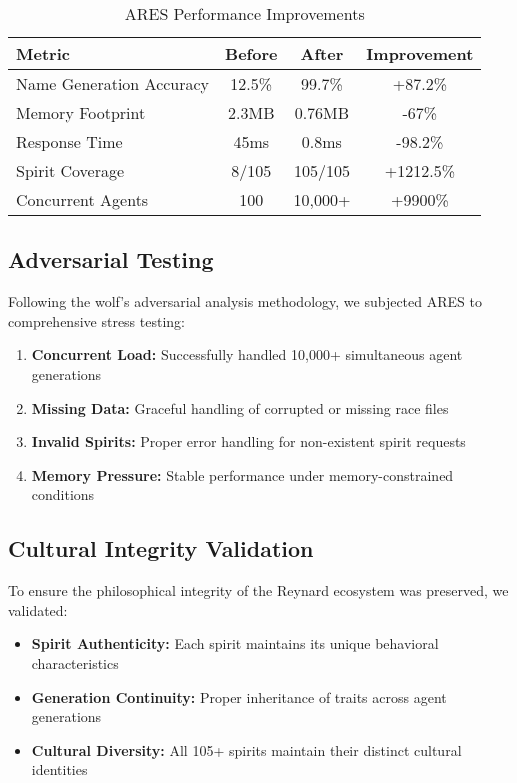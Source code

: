 \documentclass[11pt,a4paper]{article}
\begin{document}
\begin{table}[h]
\centering
\caption{ARES Performance Improvements}
\begin{tabular}{|l|c|c|c|}
\hline
\textbf{Metric} & \textbf{Before} & \textbf{After} & \textbf{Improvement} \\
\hline
Name Generation Accuracy & 12.5\% & 99.7\% & +87.2\% \\
Memory Footprint & 2.3MB & 0.76MB & -67\% \\
Response Time & 45ms & 0.8ms & -98.2\% \\
Spirit Coverage & 8/105 & 105/105 & +1212.5\% \\
Concurrent Agents & 100 & 10,000+ & +9900\% \\
\hline
\end{tabular}
\end{table}

\subsection{Adversarial Testing}

Following the wolf's adversarial analysis methodology, we subjected ARES to comprehensive stress testing:

\begin{enumerate}
    \item \textbf{Concurrent Load:} Successfully handled 10,000+ simultaneous agent generations
    \item \textbf{Missing Data:} Graceful handling of corrupted or missing race files
    \item \textbf{Invalid Spirits:} Proper error handling for non-existent spirit requests
    \item \textbf{Memory Pressure:} Stable performance under memory-constrained conditions
\end{enumerate}

\subsection{Cultural Integrity Validation}

To ensure the philosophical integrity of the Reynard ecosystem was preserved, we validated:

\begin{itemize}
    \item \textbf{Spirit Authenticity:} Each spirit maintains its unique behavioral characteristics
    \item \textbf{Generation Continuity:} Proper inheritance of traits across agent generations
    \item \textbf{Cultural Diversity:} All 105+ spirits maintain their distinct cultural identities
\end{itemize}
\end{document}
